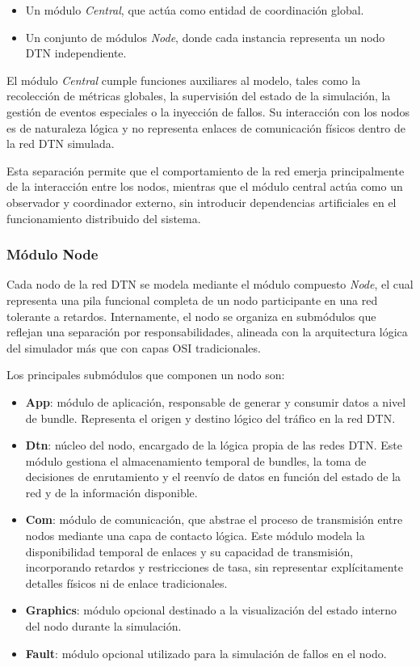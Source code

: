 \begin{itemize}
\item Un módulo \textit{Central}, que actúa como entidad de coordinación global.
\item Un conjunto de módulos \textit{Node}, donde cada instancia representa un nodo DTN independiente.
\end{itemize}

El módulo \textit{Central} cumple funciones auxiliares al modelo, tales como la recolección de métricas globales, la supervisión del estado de la simulación, la gestión de eventos especiales o la inyección de fallos. Su interacción con los nodos es de naturaleza lógica y no representa enlaces de comunicación físicos dentro de la red DTN simulada.

Esta separación permite que el comportamiento de la red emerja principalmente de la interacción entre los nodos, mientras que el módulo central actúa como un observador y coordinador externo, sin introducir dependencias artificiales en el funcionamiento distribuido del sistema.

\subsubsection{Módulo Node}

Cada nodo de la red DTN se modela mediante el módulo compuesto \textit{Node}, el cual representa una pila funcional completa de un nodo participante en una red tolerante a retardos. Internamente, el nodo se organiza en submódulos que reflejan una separación por responsabilidades, alineada con la arquitectura lógica del simulador más que con capas OSI tradicionales.

Los principales submódulos que componen un nodo son:

\begin{itemize}
\item \textbf{App}: módulo de aplicación, responsable de generar y consumir datos a nivel de bundle. Representa el origen y destino lógico del tráfico en la red DTN.

\item \textbf{Dtn}: núcleo del nodo, encargado de la lógica propia de las redes DTN. Este módulo gestiona el almacenamiento temporal de bundles, la toma de decisiones de enrutamiento y el reenvío de datos en función del estado de la red y de la información disponible.

\item \textbf{Com}: módulo de comunicación, que abstrae el proceso de transmisión entre nodos mediante una capa de contacto lógica. Este módulo modela la disponibilidad temporal de enlaces y su capacidad de transmisión, incorporando retardos y restricciones de tasa, sin representar explícitamente detalles físicos ni de enlace tradicionales.

\item \textbf{Graphics}: módulo opcional destinado a la visualización del estado interno del nodo durante la simulación.

\item \textbf{Fault}: módulo opcional utilizado para la simulación de fallos en el nodo.
\end{itemize}

